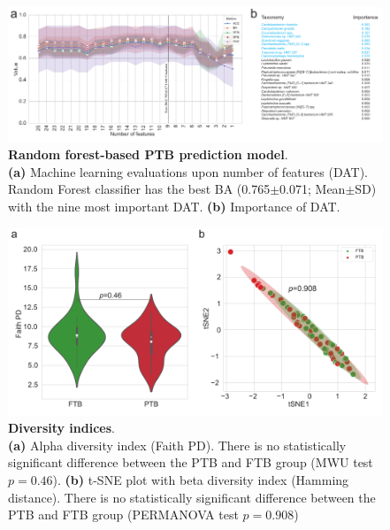 \documentclass[11pt, a4paper, onecolumn, oneside]{report}
\begin{document}
            \begin{figure}[p]
                \centering
                \includegraphics[width=\linewidth]{Figures/PTB/Fig3-ML.pdf}
                \caption[Random forest-based PTB prediction model]{\textbf{Random forest-based PTB prediction model}. \\
                    \textbf{(a)} Machine learning evaluations upon number of features (DAT). Random Forest classifier has the best BA (0.765$\pm$0.071; Mean$\pm$SD) with the nine most important DAT. \textbf{(b)} Importance of DAT.}
                \label{fig:PTB-ML}
            \end{figure}
            \clearpage

            \begin{figure}[p]
                \centering
                \includegraphics[width=\linewidth]{Figures/PTB/FigS1-Diversity.pdf}
                \caption[Diversity indices]{\textbf{Diversity indices}. \\
                    \textbf{(a)} Alpha diversity index (Faith PD). There is no statistically significant difference between the PTB and FTB group (MWU test $p=0.46$). \textbf{(b)} t-SNE plot with beta diversity index (Hamming distance). There is no statistically significant difference between the PTB and FTB group (PERMANOVA test $p=0.908$)}
                \label{fig:PTB-diversity}
            \end{figure}
            \clearpage
\end{document}
